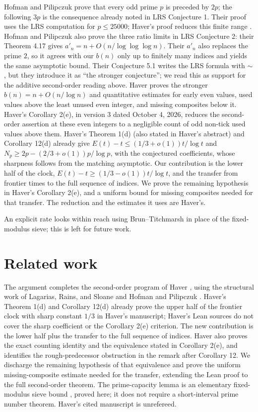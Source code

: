 Hofman and Pilipczuk \cite[Theorem 4.3]{hp} prove that every odd prime
$p$ is preceded by $2p$; the following $3p$ is the consequence already
noted in LRS Conjecture 1. Their proof uses the LRS computation for
$p\leq25000$; Haver's proof reduces this finite range \cite{haver}.
Hofman and Pilipczuk also prove the three ratio limits in LRS Conjecture 2:
their Theorem 4.17 gives $a'_n=n+O(n/\log\log\log n)$.
Their $a'_n$ also replaces the prime $2$, so it agrees with our $b(n)$
only up to finitely many indices and yields the same asymptotic bound.
Their Conjecture 5.1 writes the LRS formula with $\sim$, but they
introduce it as ``the stronger conjecture''; we read this as support for
the additive second-order reading above.
Haver \cite{haver} proves the
stronger $b(n)=n+O(n/\log n)$ and quantitative estimates for early even
values, used values above the least unused even integer, and missing
composites below it. Haver's Corollary 2(e), in version 3 dated October 4,
2026, reduces the second-order assertion at these even integers to a
negligible count of odd non-tick used values above them. Haver's Theorem 1(d)
(also stated in Haver's abstract) and Corollary 12(d) already give
$E(t)-t\leq(1/3+o(1))t/\log t$ and
$N_p\geq2p-(2/3+o(1))p/\log p$, with the conjectured coefficients, whose sharpness follows from the matching asymptotic.
Our contribution is the lower half of the clock,
$E(t)-t\geq(1/3-o(1))t/\log t$, and the transfer from frontier times
to the full sequence of indices.
We prove the remaining hypothesis in Haver's Corollary 2(e), and a
uniform bound for missing composites needed for that transfer.
The reduction and the estimates it uses are Haver's.

An explicit rate looks within reach using Brun--Titchmarsh in place
of the fixed-modulus sieve; this is left for future work.

\section{Related work}\label{sec:related}

The argument completes the second-order program of Haver \cite{haver},
using the structural work of Lagarias, Rains, and Sloane \cite{lrs} and
Hofman and Pilipczuk \cite{hp}. Haver's Theorem 1(d) and Corollary 12(d)
already prove the upper half of the frontier clock with sharp constant
$1/3$ in Haver's manuscript; Haver's Lean sources do not cover the sharp
coefficient or the Corollary 2(e) criterion. The new contribution is the
lower half plus the transfer to the full sequence of indices.
Haver also proves the exact counting identity and the equivalence stated
in Corollary 2(e), and identifies the rough-predecessor obstruction in
the remark after Corollary 12. We discharge the remaining hypothesis of
that equivalence and prove the uniform missing-composite estimate needed
for the transfer, extending the Lean proof to the full second-order theorem.
The prime-capacity lemma is an elementary fixed-modulus sieve bound
\cite{sievebook}, proved here; it does not require a short-interval
prime number theorem. Haver's cited manuscript is unrefereed.


